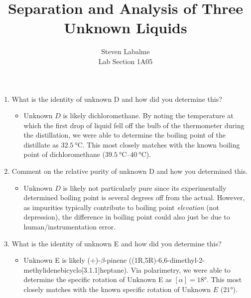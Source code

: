 \documentclass[titlepage]{article}
\title{Separation and Analysis of Three Unknown Liquids}
\author{
    Steven Labalme\\
    \normalsize Lab Section 1A05
}
\begin{document}
\maketitle



\pagestyle{main}
\renewcommand{\leftmark}{Lab Assignment 2b}
\begin{enumerate}
    \item What is the identity of unknown D and how did you determine this?
    \begin{center}
        \footnotesize
    \end{center}
    \begin{itemize}
        \item Unknown $D$ is likely dichloromethane. By noting the temperature at which the first drop of liquid fell off the bulb of the thermometer during the distillation, we were able to determine the boiling point of the distillate as $\SI{32.5}{\celsius}$. This most closely matches with the known boiling point of dichloromethane ($\SIrange{39.5}{40}{\celsius}$).
    \end{itemize}
    \item Comment on the relative purity of unknown D and how you determined this.
    \begin{itemize}
        \item Unknown $D$ is likely not particularly pure since its experimentally determined boiling point is several degrees off from the actual. However, as impurities typically contribute to boiling point \emph{elevation} (not depression), the difference in boiling point could also just be due to human/instrumentation error.
    \end{itemize}
    \item What is the identity of unknown E and how did you determine this?
    \begin{center}
        \footnotesize
    \end{center}
    \begin{itemize}
        \item Unknown E is likely ($+$)-$\beta$-pinene ((1R,5R)-6,6-dimethyl-2-methylidenebicyclo[3.1.1]heptane). Via polarimetry, we were able to determine the specific rotation of Unknown E as $[\alpha]=\ang{18}$. This most closely matches with the known specific rotation of Unknown $E$ ($\ang{21}$).
    \end{itemize}

\end{enumerate}
\end{document}
